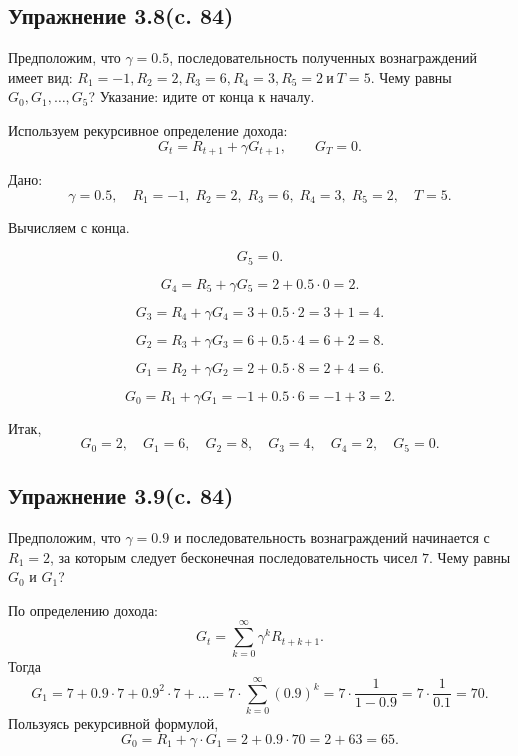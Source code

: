 \subsection{Упражнение 3.8(c. 84)}
Предположим, что $\gamma = 0.5$, последовательность полученных вознаграждений имеет вид: $R_1 = -1, R_2 = 2, R_3 = 6, R_4 = 3, R_5 = 2 \ \text{и} \ T = 5$. Чему равны $G_0, G_1, \dots , G_5$? Указание: идите от конца к началу.
\begin{solution}
    Используем рекурсивное определение дохода:
    \[
    G_t = R_{t+1} + \gamma G_{t+1}, 
    \qquad G_T = 0.
    \]
    
    Дано: 
    \[
    \gamma = 0.5, \quad 
    R_1=-1,\; R_2=2,\; R_3=6,\; R_4=3,\; R_5=2, \quad T=5.
    \]
    
    Вычисляем с конца.
    
    \[
    G_5 = 0.
    \]
    
    \[
    G_4 = R_5 + \gamma G_5
         = 2 + 0.5 \cdot 0
         = 2.
    \]
    
    \[
    G_3 = R_4 + \gamma G_4
         = 3 + 0.5 \cdot 2
         = 3 + 1
         = 4.
    \]
    
    \[
    G_2 = R_3 + \gamma G_3
         = 6 + 0.5 \cdot 4
         = 6 + 2
         = 8.
    \]
    
    \[
    G_1 = R_2 + \gamma G_2
         = 2 + 0.5 \cdot 8
         = 2 + 4
         = 6.
    \]
    
    \[
    G_0 = R_1 + \gamma G_1
         = -1 + 0.5 \cdot 6
         = -1 + 3
         = 2.
    \]
    
    Итак,
    \[
    G_0 = 2, \quad
    G_1 = 6, \quad
    G_2 = 8, \quad
    G_3 = 4, \quad
    G_4 = 2, \quad
    G_5 = 0.
    \]
\end{solution}

\subsection{Упражнение 3.9(c. 84)}
Предположим, что $\gamma = 0.9$ и последовательность вознаграждений начинается с $R_1 = 2$, за которым следует бесконечная последовательность чисел $7$.
Чему равны $G_0$ и $G_1$? 
\begin{solution}
    По определению дохода:
    \[
    G_t = \sum_{k=0}^{\infty} \gamma^k R_{t+k+1}.
    \]
    Тогда
    \[
    G_1 = 7 + 0.9 \cdot 7 + 0.9^2 \cdot 7 + \dots = 
    7 \cdot \sum_{k=0}^{\infty} (0.9)^k
     = 7 \cdot \frac{1}{1-0.9}
     = 7 \cdot \frac{1}{0.1}
     = 70.
    \]
    Пользуясь рекурсивной формулой,
    \[G_0 = R_1 + \gamma \cdot G_1 
     = 2 + 0.9 \cdot 70
     = 2 + 63
     = 65.\]
\end{solution}

